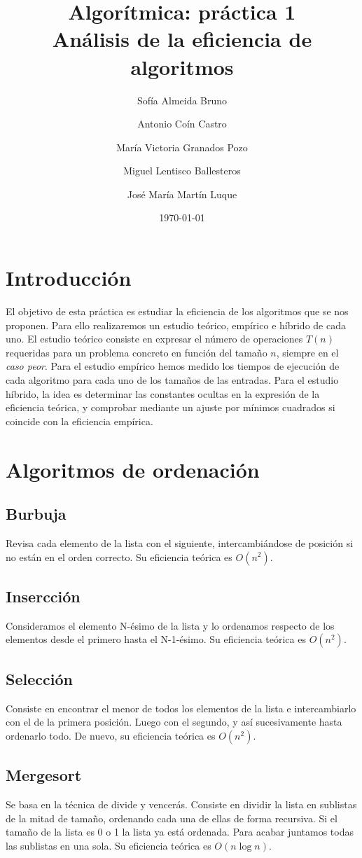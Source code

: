 \documentclass[11pt]{article}
\title{Algorítmica: práctica 1 \\ \large Análisis de la eficiencia de algoritmos}
\author{Sofía Almeida Bruno \and Antonio Coín Castro \and María Victoria Granados Pozo \and Miguel Lentisco Ballesteros \and José María Martín Luque}
\date{\today}
\begin{document}
\maketitle

\newpage

\section*{Introducción}
El objetivo de esta práctica es estudiar la eficiencia de los algoritmos que se nos proponen. Para ello realizaremos un estudio teórico, empírico e híbrido de cada uno. 
El estudio teórico consiste en expresar el número de operaciones $T(n)$ requeridas para un problema concreto en función del tamaño $n$, siempre en el \textit{caso peor}. Para el estudio empírico hemos medido los tiempos de ejecución de cada algoritmo para cada uno de los tamaños de las entradas. Para el estudio híbrido, la idea es determinar las constantes ocultas en la expresión de la eficiencia teórica, y comprobar mediante un ajuste por mínimos cuadrados si coincide con la eficiencia empírica.

\section*{Algoritmos de ordenación}
\subsection*{Burbuja}
Revisa cada elemento de la lista con el siguiente, intercambiándose de posición si no están en el orden correcto. Su eficiencia teórica es $O(n^2)$.
\subsection*{Insercción}
Consideramos el elemento N-ésimo de la lista y lo ordenamos respecto de los elementos desde el primero hasta el N-1-ésimo. Su eficiencia teórica es $O(n^2)$.

\subsection*{Selección}
Consiste en encontrar el menor de todos los elementos de la lista e intercambiarlo con el de la primera posición. Luego con el segundo, y así sucesivamente hasta ordenarlo todo. De nuevo, su eficiencia teórica es $O(n^2)$.

\subsection*{Mergesort}
Se basa en la técnica de divide y vencerás. Consiste en dividir la lista en sublistas de la mitad de tamaño, ordenando cada una de ellas de forma recursiva. Si el tamaño de la lista es 0 o 1 la lista ya está ordenada. Para acabar juntamos todas las sublistas en una sola. Su eficiencia teórica es $O(n\log n)$.
\end{document}

